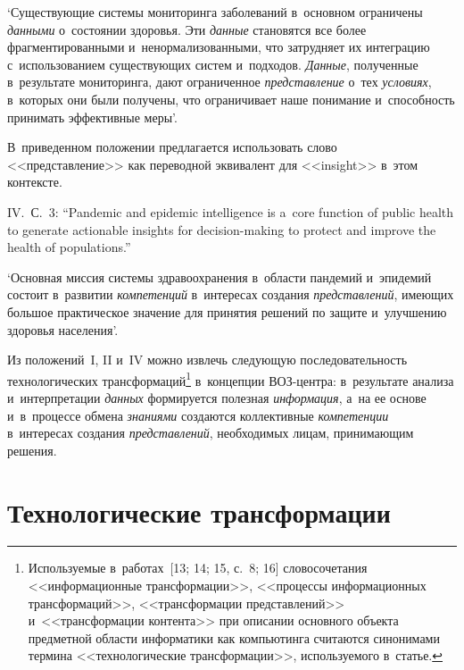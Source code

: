 \begin{multicols}{2}
`Существующие системы мониторинга заболеваний в~основном ограничены 
\textit{данными} о~состоянии здоровья. Эти \textit{данные} становятся все более 
фрагментированными и~ненормализованными, что затрудняет их интеграцию 
с~использованием существующих систем и~подходов. \textit{Данные}, полученные 
в~результате мониторинга, дают ограниченное \textit{представление} о~тех 
\textit{условиях}, в~которых они были получены, что ограничивает наше 
понимание и~способность принимать эффективные меры'.

В~приведенном положении предлагается использовать слово <<представление>> 
как переводной эквивалент для <<insight>> в~этом контексте.


IV.~С.~3: ``Pandemic and epidemic intelligence is a~core function of public health to 
generate actionable insights for decision-making to protect and improve the health of 
populations.''

`Основная миссия системы здравоохранения в~области пандемий и~эпидемий 
состоит в~развитии \textit{компетенций} в~интересах создания 
\textit{представлений}, имеющих большое практическое значение для принятия 
решений по защите и~улучшению здоровья населения'.

Из положений~I, II и~IV можно извлечь следующую последовательность 
технологических трансформаций\footnote{Используемые в~работах~[13; 14; 15, с.~8; 16] 
словосочетания <<информационные трансформации>>, <<процессы информационных 
трансформаций>>, <<трансформации представлений>> и~<<трансформации контента>> при описании 
основного объекта предметной области информатики как компьютинга считаются синонимами термина 
<<технологические трансформации>>, используемого \mbox{в~статье}.} в~концепции ВОЗ-центра: 
в~результате анализа и~интерпретации \textit{данных} формируется полезная 
\textit{информация}, а~на ее основе и~в~процессе обмена \textit{знаниями} 
создаются коллективные \textit{компетенции} в~интересах создания 
\textit{представлений}, необходимых лицам, принимающим решения.

\vspace*{-7pt}

\section{Технологические трансформации} %

\vspace*{-2pt}


\end{multicols}
